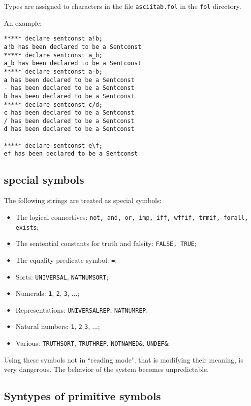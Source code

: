 Types are assigned to characters in the file {\tt asciitab.fol}
in the {\tt fol} directory.

An example:
\begin{verbatim}
***** declare sentconst a!b;
a!b has been declared to be a Sentconst
***** declare sentconst a_b;
a_b has been declared to be a Sentconst
***** declare sentconst a-b;
a has been declared to be a Sentconst
- has been declared to be a Sentconst
b has been declared to be a Sentconst
***** declare sentconst c/d;
c has been declared to be a Sentconst
/ has been declared to be a Sentconst
d has been declared to be a Sentconst

***** declare sentconst e\f;
ef has been declared to be a Sentconst
\end{verbatim}

\subsection{{\GF} special symbols}

The following strings are treated as special symbols:

\begin{itemize}
\item The logical connectives:
{\tt not, and, or, imp, iff, wffif, trmif, forall, exists};
\item The sentential constants for truth and falsity:
{\tt FALSE, TRUE}; 
\item The equality predicate symbol: {\tt =};
\item Sorts: {\tt UNIVERSAL}, {\tt NATNUMSORT};
\item Numerals: {\tt 1}, {\tt 2}, {\tt 3}, ...;
\item Representations: {\tt UNIVERSALREP}, {\tt NATNUMREP};
\item Natural numbers: {\tt 1}, {\tt 2} {\tt 3}, ...;
\item Various: {\tt TRUTHSORT}, {\tt TRUTHREP}, {\tt NOTNAMED\&}, {\tt UNDEF\&};
\end{itemize}



Using these symbols not in ``reading mode",
that is modifying their meaning,
is very dangerous. The behavior
of the system becomes unpredictable.






\subsection{Syntypes of primitive symbols}

